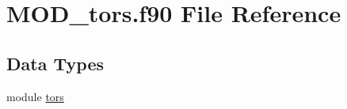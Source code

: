 \hypertarget{MOD__tors_8f90}{\section{M\-O\-D\-\_\-tors.\-f90 File Reference}
\label{MOD__tors_8f90}
}
\subsection*{Data Types}
\begin{DoxyCompactItemize}
\item 
module \hyperlink{classtors}{tors}
\end{DoxyCompactItemize}

